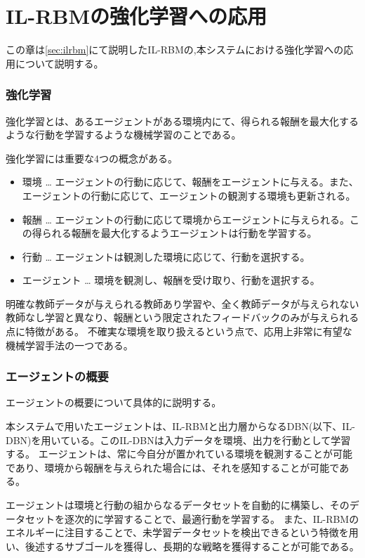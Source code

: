 \chapter{IL-RBMの強化学習への応用}
この章は\ref{sec:ilrbm}にて説明したIL-RBMの,本システムにおける強化学習への応用について説明する。


\subsection{強化学習}
強化学習とは、あるエージェントがある環境内にて、得られる報酬を最大化するような行動を学習するような機械学習のことである。

強化学習には重要な4つの概念がある。

\begin{itemize}
  \item 環境 … エージェントの行動に応じて、報酬をエージェントに与える。また、エージェントの行動に応じて、エージェントの観測する環境も更新される。
  \item 報酬 … エージェントの行動に応じて環境からエージェントに与えられる。この得られる報酬を最大化するようエージェントは行動を学習する。
  \item 行動  … エージェントは観測した環境に応じて、行動を選択する。
  \item エージェント … 環境を観測し、報酬を受け取り、行動を選択する。
\end{itemize}

明確な教師データが与えられる教師あり学習や、全く教師データが与えられない教師なし学習と異なり、報酬という限定されたフィードバックのみが与えられる点に特徴がある。
不確実な環境を取り扱えるという点で、応用上非常に有望な機械学習手法の一つである。

\subsection{エージェントの概要}
エージェントの概要について具体的に説明する。

本システムで用いたエージェントは、IL-RBMと出力層からなるDBN(以下、IL-DBN)を用いている。このIL-DBNは入力データを環境、出力を行動として学習する。
エージェントは、常に今自分が置かれている環境を観測することが可能であり、環境から報酬を与えられた場合には、それを感知することが可能である。

エージェントは環境と行動の組からなるデータセットを自動的に構築し、そのデータセットを逐次的に学習することで、最適行動を学習する。
また、IL-RBMのエネルギーに注目することで、未学習データセットを検出できるという特徴を用い、後述するサブゴールを獲得し、長期的な戦略を獲得することが可能である。

